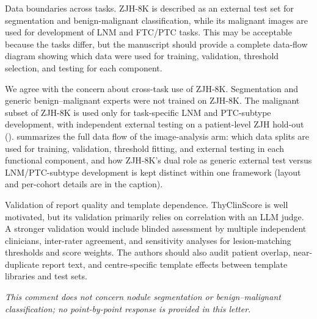 \begin{reviewercomment}
Data boundaries across tasks. ZJH-8K is described as an external test set for segmentation and benign-malignant classification, while its malignant images are used for development of LNM and FTC/PTC tasks. This may be acceptable because the tasks differ, but the manuscript should provide a complete data-flow diagram showing which data were used for training, validation, threshold selection, and testing for each component.
\end{reviewercomment}
\begin{authorresponse}
We agree with the concern about cross-task use of ZJH-8K. Segmentation and generic benign–malignant experts were not trained on ZJH-8K. The malignant subset of ZJH-8K is used only for task-specific LNM and PTC-subtype development, with independent external testing on a patient-level ZJH hold-out ().  summarizes the full data flow of the image-analysis arm: which data splits are used for training, validation, threshold fitting, and external testing in each functional component, and how ZJH-8K's dual role as generic external test versus LNM/PTC-subtype development is kept distinct within one framework (layout and per-cohort details are in the caption).\par
\par
\end{authorresponse}

\begin{reviewercomment}
Validation of report quality and template dependence. ThyClinScore is well motivated, but its validation primarily relies on correlation with an LLM judge. A stronger validation would include blinded assessment by multiple independent clinicians, inter-rater agreement, and sensitivity analyses for lesion-matching thresholds and score weights. The authors should also audit patient overlap, near-duplicate report text, and centre-specific template effects between template libraries and test sets.
\end{reviewercomment}
\begin{authorresponse}
\noindent\textit{This comment does not concern nodule segmentation or benign--malignant classification; no point-by-point response is provided in this letter.}
\end{authorresponse}

